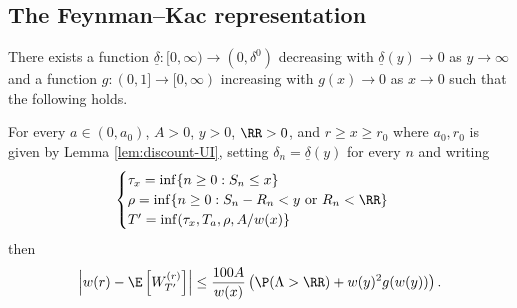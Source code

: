 \documentclass[10pt,a4paper]{article}
\begin{document}
\subsection{The Feynman--Kac representation}


\begin{corollary}\label{cor:Feynman-Kac}
There exists a function $\underline{\delta} : [0,\infty) \to (0,\delta^0)$ decreasing with $\underline{\delta}(y) \to 0$ as $y\to\infty$ and a function $g:(0,1] \to [0,\infty)$ increasing with $g(x)\to 0$ as $x\to 0$ such that the following holds. 

For every $a\in (0,a_0)$, $A>0$, $y>0$, $\RR>0$, and $r \geq x \geq r_0$ where $a_0, r_0$ is given by Lemma \ref{lem:discount-UI}, setting $\delta_n = \underline{\delta}(y)$ for every $n$ and writing 
\begin{equation*}
\begin{cases}
\tau_x = \inf\{ n\geq 0 : S_n \leq x \} \\
\rho = \inf\{n\geq 0 : S_n-R_n < y \text{ or } R_n < \RR\} \\
T' = \inf(\tau_x, T_a, \rho, A/w(x) \}
\end{cases}
\end{equation*}
then 
\begin{equation}\label{eq:FK}
\left| w(r) - \E\left[ W^{(r)}_{T'}\right] \right| \leq  \frac{100 A}{w(x)} \left( \P(\Lambda > \RR) + w(y)^2 g(w(y))\right) .
\end{equation}
\end{corollary}
\end{document}
